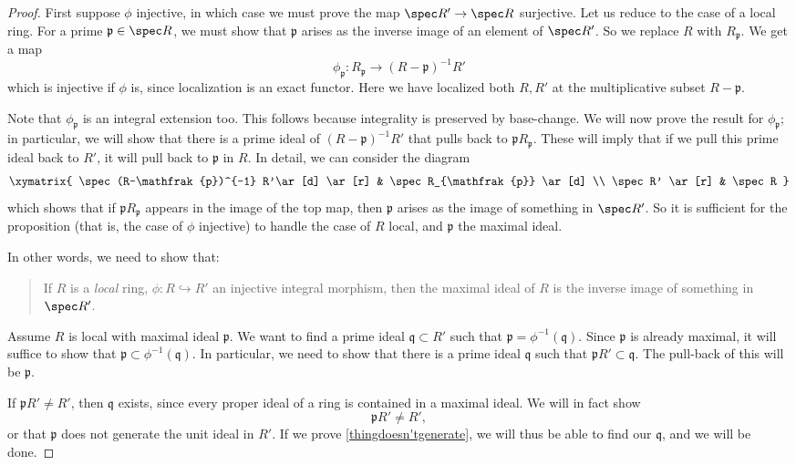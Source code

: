 \begin{proof} First suppose $\phi$ injective, in which case we must prove the
map $\spec R' \to \spec R$ surjective.
Let us reduce to the case of a local ring.
For a prime $\mathfrak{p} \in \spec R$, we must show that $\mathfrak{p}$
arises as the inverse image of an element of $\spec R'$.
So we replace $R$ with $R_{\mathfrak{p}}$.  We get a map
\[ \phi_{\mathfrak{p}}: R_{\mathfrak{p}} \to (R- \mathfrak{p})^{-1} R'  \]
which is injective if $\phi$ is, since localization is an exact functor. Here
we
have localized both $R, R'$ at the multiplicative subset $R - \mathfrak{p}$.

Note that $\phi_{\mathfrak{p}}$ is an integral extension too. This follows
because integrality is preserved by base-change.
We will now prove the result for $\phi_{\mathfrak{p}}$; in particular, we
will show
that there is a prime ideal of $(R- \mathfrak{p})^{-1} R'$ that pulls back to
$\mathfrak{p}R_{\mathfrak{p}}$. These will imply that if we pull this prime
ideal back to $R'$, it will pull back to $\mathfrak{p}$ in $R$. In detail, we
can consider the diagram
\[ \xymatrix{
\spec (R-\mathfrak{p})^{-1} R'\ar[d]  \ar[r] & \spec R_{\mathfrak{p}} \ar[d] \\
\spec R' \ar[r] &  \spec R
}\]
which shows that if $\mathfrak{p} R_{\mathfrak{p}}$ appears in the image of the top map, then
$\mathfrak{p}$
arises as the image of something in $\spec R'$.
So it is sufficient for the proposition (that is, the case of $\phi$
injective) to handle the case of $R$ local, and
$\mathfrak{p}$ the maximal ideal.


In other words, we need to show that:
\begin{quote}
If $R$ is a \emph{local} ring, $\phi: R \hookrightarrow R'$ an injective
integral morphism, then the maximal ideal of $R$ is the inverse image of
something in $\spec R'$.
\end{quote}

Assume $R$ is local with maximal ideal $\mathfrak{p}$. We want to find a prime ideal $\mathfrak{q} \subset R'$ such that
$\mathfrak{p}  = \phi^{-1}(\mathfrak{q})$. Since $\mathfrak{p}$ is already
maximal, it will suffice to show that $\mathfrak{p} \subset
\phi^{-1}(\mathfrak{q})$. In particular, we need to show that there is a prime
ideal $\mathfrak{q}$ such that
\( \mathfrak{p} R' \subset \mathfrak{q}.  \)
The pull-back of this will be $\mathfrak{p}$.

If $\mathfrak{p}R' \neq R'$, then
$\mathfrak{q}$ exists, since every proper ideal of a ring is contained in a
maximal ideal.  We will in fact show
\begin{equation} \label{thingdoesn'tgenerate} \mathfrak{p} R' \neq R',
\end{equation}
or that $\mathfrak{p}$ does not generate the unit ideal in $R'$.
If we prove \eqref{thingdoesn'tgenerate}, we will thus be able to find our
$\mathfrak{q}$, and we will be done.


\end{proof}
